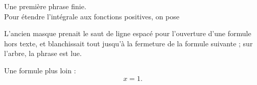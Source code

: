 Une première phrase finie.\\[0.2em]
Pour étendre l'intégrale aux fonctions positives, on pose
\begin{definition} %
  L'ancien masque prenait le saut de ligne espacé pour l'ouverture d'une
  formule hors texte, et blanchissait tout jusqu'à la fermeture de la
  formule suivante ; sur l'arbre, la phrase est lue.
\end{definition}
Une formule plus loin : \[ x = 1. \]
